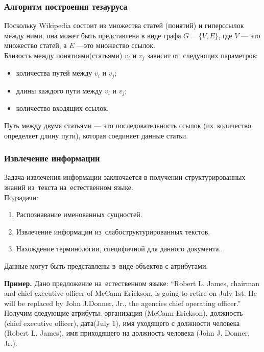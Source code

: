 \documentclass{beamer}
\begin{document}
\begin{frame}
\frametitle{Алгоритм построения тезауруса}
Поскольку Wikipedia состоит из множества статей (понятий) и гиперссылок между ними, она может быть представлена
в виде графа $G = \{V,E\}$, где $V$  --- это множество статей, а $E$ ---это множество ссылок.\\
Близость между понятиями(статьями) $v_i$ и $v_j$ зависит от~следующих параметров:

\vspace{1cm}

\begin{itemize}
\item{количества путей между $v_i$ и $v_j$;}
\item{длины каждого пути между $v_i$ и $v_j$;}
\item{количество входящих ссылок.}
\end{itemize}

\vspace{1cm}
Путь между двумя статьями --- это последовательность ссылок (их~количество определяет длину пути), которая соединяет данные статьи.\\

\end{frame}

\begin{frame}
\frametitle{Извлечение информации}
Задача извлечения информации заключается в получении структурированных знаний
из~текста на~естественном языке.\\

\vspace{1cm}
Подзадачи:
\begin{enumerate}
\item{Распознавание именованных сущностей.}
\item{Извлечение информации из~слабоструктурированных текстов.}
\item{Нахождение терминологии, специфичной для данного документа..}
\end{enumerate}

\vspace{1cm}

Данные могут быть представлены в~виде объектов с атрибутами.

\vspace{1cm}
{\bf Пример.} Дано предложение на~естественном языке: 
``Robert L. James, chairman and chief executive
officer of McCann-Erickson, is going to retire on July 1st. He will be replaced
by John J.Donner, Jr., the agencies chief operating officer.''
Получим следующие атрибуты: организация (McCann-Erickson), должность (chief executive officer),
дата(July 1), имя уходящего с должности человека (Robert L. James), имя
приходящего на должность человека (John J. Donner, Jr.).

\end{frame}
\end{document}
